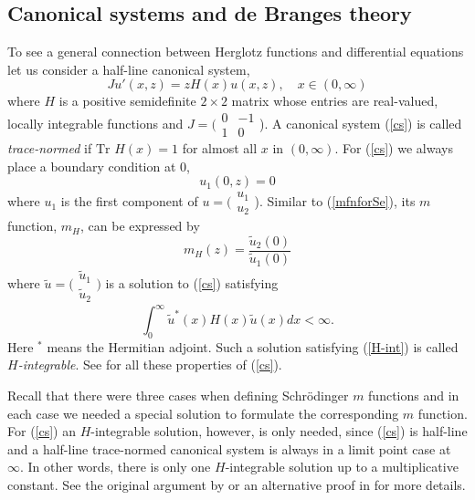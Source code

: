 \documentclass[preprint,12pt]{elsarticle}
\begin{document}
\subsection{Canonical systems and de Branges theory} 
To see a general connection between Herglotz functions and differential equations let us consider a half-line canonical system,  
\begin{equation}
\label{cs}
Ju'(x,z)=zH(x)u(x,z), \quad x\in(0,\infty)
\end{equation}
 where $H$ is a positive semidefinite $2\times2$ matrix whose entries are real-valued, locally integrable functions and $J=\big( \begin{smallmatrix}  0 & -1 \\ 1 &0 \end{smallmatrix}$\big). A canonical system (\ref{cs}) is called \textit{trace-normed} if $\textrm{Tr }H(x)=1$ for almost all $x$ in $(0,\infty)$. For (\ref{cs}) we always place a boundary condition at 0,
\begin{equation}
\label{bcat0forcs}
u_1(0,z)=0
\end{equation}
where $u_1$ is the first component of $u=\big( \begin{smallmatrix}  u_1 \\ u_2\end{smallmatrix}$\big). Similar to 
(\ref{mfnforSe}),  its $m$ function, $m_H$, can be expressed by 
\begin{equation}
\label{mfnforcs}
m_H(z)=\frac{\tilde{u}_2(0)}{\tilde{u}_1(0)}
\end{equation}
where $\tilde{u}=\big( \begin{smallmatrix} \tilde{u}_1 \\ \tilde{u}_2 \end {smallmatrix} \big) $ is a solution to (\ref{cs}) satisfying   
\begin{equation}
\label{H-int}
\int_0^{\infty} \tilde{u}^*(x)H(x)\tilde{u}(x)dx<\infty.
\end{equation}
Here $^*$ means the Hermitian adjoint. Such a solution satisfying (\ref{H-int}) is called \textit{$H$-integrable}. See \cite{Win,Win2} for all these properties of (\ref{cs}). 

Recall that there were three cases when defining Schr\"odinger $m$ functions and in each case we needed a special solution to formulate the corresponding $m$ function. For (\ref{cs}) an $H$-integrable solution, however, is only needed, since (\ref{cs}) is half-line and a half-line trace-normed canonical system is always in a limit point case at $\infty$. In other words, there is only one $H$-integrable solution up to a multiplicative constant. See the original argument by \cite{deB2} or an alternative proof in \cite{Ach} for more details.\\
\end{document}
